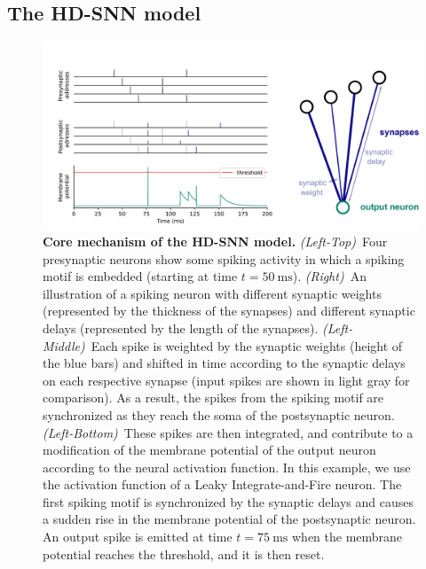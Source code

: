 \documentclass[default]{sn-jnl}%
\theoremstyle{thmstyleone}%
\theoremstyle{thmstyletwo}%
\theoremstyle{thmstylethree}%
\newcommand{\ms}{\si{\milli\second}}%
\begin{document}
\subsection{The HD-SNN model}
%
\begin{figure}%
    \centering
    \includegraphics[width=0.980\linewidth]{figures/HDSNN_graph.pdf}
    \caption{\textbf{Core mechanism of the HD-SNN model.} \textit{(Left-Top)}~Four presynaptic neurons show some spiking activity in which a spiking motif is embedded (starting at time $t=50~\ms$). \textit{(Right)}~An illustration of a spiking neuron with different synaptic weights (represented by the thickness of the synapses) and different synaptic delays (represented by the length of the synapses). \textit{(Left-Middle)}~Each spike is weighted by the synaptic weights (height of the blue bars) and shifted in time according to the synaptic delays on each respective synapse (input spikes are shown in light gray for comparison). As a result, the spikes from the spiking motif are synchronized as they reach the soma of the postsynaptic neuron. \textit{(Left-Bottom)}~These spikes are then integrated, and contribute to a modification of the membrane potential of the output neuron according to the neural activation function. In this example, we use the activation function of a Leaky Integrate-and-Fire neuron. The first spiking motif is synchronized by the synaptic delays and causes a sudden rise in the membrane potential of the postsynaptic neuron. An output spike is emitted at time $t=75~\ms$ when the membrane potential reaches the threshold, and it is then reset.}%
    \label{fig:izhikevich}%
\end{figure}%
% 
\end{document}
